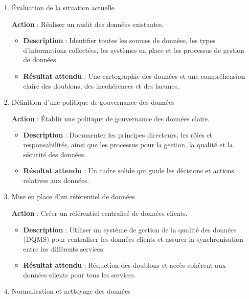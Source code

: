 \begin{enumerate}
    \item Évaluation de la situation actuelle

        \textbf{Action} : Réaliser un audit des données existantes.

        \begin{itemize}
            \item \textbf{Description} : Identifier toutes les sources de données, les types d'informations collectées, les systèmes en place et les processus de gestion de données.
            \item \textbf{Résultat attendu} : Une cartographie des données et une compréhension claire des doublons, des incohérences et des lacunes.
        \end{itemize}

    \item Définition d’une politique de gouvernance des données

        \textbf{Action} : Établir une politique de gouvernance des données claire.

        \begin{itemize}
            \item \textbf{Description} : Documenter les principes directeurs, les rôles et responsabilités, ainsi que les processus pour la gestion, la qualité et la sécurité des données.
            \item \textbf{Résultat attendu} : Un cadre solide qui guide les décisions et actions relatives aux données.
        \end{itemize}

    \item Mise en place d'un référentiel de données

        \textbf{Action} : Créer un référentiel centralisé de données clients.

        \begin{itemize}
            \item \textbf{Description} : Utiliser un système de gestion de la qualité des données (DQMS) pour centraliser les données clients et assurer la synchronisation entre les différents services.
            \item \textbf{Résultat attendu} : Réduction des doublons et accès cohérent aux données clients pour tous les services.
        \end{itemize}

    \item Normalisation et nettoyage des données


\end{enumerate}
